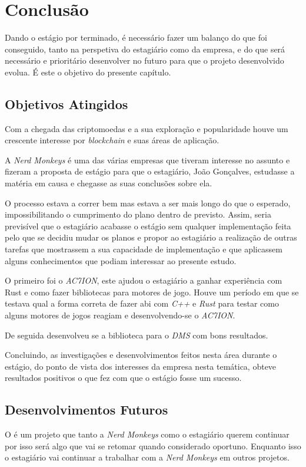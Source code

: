 
\chapter{Conclusão}
\label{chap:conclusao}
Dando o estágio por terminado, é necessário fazer um balanço do que foi conseguido, tanto na perspetiva
do estagiário como da empresa, e do que será necessário e prioritário desenvolver no futuro para que o projeto desenvolvido evolua. É este o objetivo do presente capítulo.

\section{Objetivos Atingidos}
 
Com a chegada das criptomoedas e a sua exploração e popularidade houve um crescente interesse por \textit{blockchain} e suas áreas de aplicação. 

A \textit{Nerd Monkeys} é uma das várias empresas que tiveram interesse no assunto e fizeram a proposta de estágio para que o estagiário, João Gonçalves, estudasse a matéria em causa e chegasse as suas conclusões sobre ela.

O processo estava a correr bem mas estava a ser mais longo do que o esperado, impossibilitando o cumprimento do plano dentro de previsto. Assim, seria previsível que o estagiário acabasse o estágio sem qualquer implementação feita pelo que se decidiu mudar os planos e propor ao estagiário a realização de outras tarefas que mostrassem a sua capacidade de implementação e que  aplicassem alguns conhecimentos que podiam interessar ao presente estudo.

O primeiro foi o \textit{AC7ION}, este ajudou o estagiário a ganhar experiência com Rust e como fazer bibliotecas para motores de jogo. Houve um período em que se testava qual a forma correta de fazer \acrshort{abi} com \textit{C++} e \textit{Rust} para testar como alguns motores de jogos reagiam e desenvolvendo-se o \textit{AC7ION}.

De seguida desenvolveu se a biblioteca para o \textit{DMS} com bons resultados.

Concluindo, as investigações e desenvolvimentos feitos nesta área durante o estágio, do ponto de vista dos interesses da empresa nesta temática, obteve resultados positivos o que fez com que o estágio fosse um sucesso.

\section{Desenvolvimentos Futuros}

O \gamechaining{} é um projeto que tanto a \textit{Nerd Monkeys} como o estagiário querem continuar por isso será algo que vai se retomar quando considerado oportuno. Enquanto isso o estagiário vai continuar a trabalhar com a \textit{Nerd Monkeys} em outros projetos.